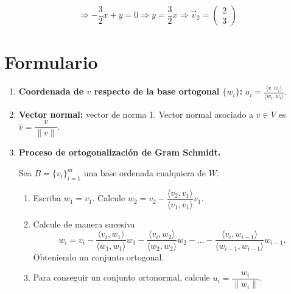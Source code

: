 \documentclass[a4paper]{article}
\begin{document}
\begin{itemize}
\[
\Rightarrow -\frac{3}{2}x + y = 0 \Rightarrow y = \frac{3}{2}x
\Rightarrow \vec{v}_2 = \begin{pmatrix} 2 \\ 3 \end{pmatrix}
\]

\vspace{0.5cm}

\end{itemize}
\newpage


\section*{Formulario}
\begin{enumerate}
    \item \textbf{Coordenada de $v$ respecto de la base ortogonal $\{w_i\}$:} $a_i=\frac{\langle v, w_i \rangle}{\langle w_i, w_i \rangle}$.


    \item \textbf{Vector normal: } vector de norma 1. Vector normal asociado a $v\in V$ es $\hat{v}=\dfrac{v}{\|v\|}.$



    \item \textbf{Proceso de ortogonalizaci\'on de Gram Schmidt.}

Sea $B = \{v_i\}_{i=1}^m $ una base ordenada cualquiera de $W $.
\begin{enumerate}
\item Escriba $w_1 = v_1$. Calcule $w_2 = v_2 - \dfrac{\langle v_2,v_1\rangle}{\langle v_1,v_1\rangle}v_1$.
\item Calcule de manera sucesiva
\[w_i=v_i-\dfrac{\langle v_i,w_1\rangle}{\langle w_1,w_1\rangle}w_1-\dfrac{\langle v_i,w_2\rangle}{\langle w_2,w_2\rangle}w_2-\dots-\dfrac{\langle v_i,w_{i-1}\rangle}{\langle w_{i-1},w_{i-1}\rangle}w_{i-1}.\]
Obteniendo un conjunto ortogonal.
\item Para conseguir un conjunto ortonormal, calcule $u_i=\dfrac{w_i}{\|w_i\|}$.
\end{enumerate}

\end{enumerate}
\end{document}
